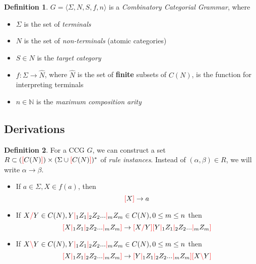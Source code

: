 \documentclass[12pt]{extarticle}
\theoremstyle{definition} \newtheorem{defn}{Definition}
\theoremstyle{definition} \newtheorem{prop}{Proposition}
\newcommand{\lc}{\textcolor{red}{\backslash}}
\newcommand{\rc}{\textcolor{red}{/}}
\newcommand{\mc}{\textcolor{red}{|}}
\newcommand{\lb}{\textcolor{red}{[}}
\newcommand{\rb}{\textcolor{red}{]}}
\begin{document}
\begin{defn}
    $ G = \langle \Sigma, N, S, f, n \rangle $ is a \emph{Combinatory Categorial Grammar}, where
    \begin{itemize}
        \item $ \Sigma $ is the set of \emph{terminals}
        \item $ N $ is the set of \emph{non-terminals} (atomic categories)
        \item $ S \in N $ is the \emph{target category}
        \item $ f : \Sigma \rightarrow \hat{N} $, where $\hat{N}$ is the set of
            \textbf{finite} subsets of $C(N)$, is the function for interpreting
            terminals
        \item $ n \in \mathbb{N} $ is the \emph{maximum composition arity}
    \end{itemize}
\end{defn}

\pagebreak
\subsection{Derivations}

\begin{defn}
    For a CCG $G$, we can construct a set $R \subset (\lb C(N) \rb) \times (\Sigma \cup \lb C(N) \rb)^*$
    of \emph{rule instances}. Instead of $(\alpha, \beta) \in R$, we will write
    $\alpha \rightarrow \beta$.

    \begin{itemize}
        \item If $ a \in \Sigma, X \in f(a) $, then \[ \lb X \rb \rightarrow a \]
        \item If $ X \rc Y \in C(N), Y \mc_1 Z_1 \mc_2 Z_2 ... \mc_m Z_m \in C(N), 0 \leq m \leq n $
            then \[ \lb X \mc_1 Z_1 \mc_2 Z_2 ... \mc_m Z_m \rb \rightarrow \lb X \rc Y \rb \lb Y \mc_1 Z_1 \mc_2 Z_2 ... \mc_m Z_m \rb \]
        \item If $ X \lc Y \in C(N), Y \mc_1 Z_1 \mc_2 Z_2 ... \mc_m Z_m \in C(N), 0 \leq m \leq n $
            then \[ \lb X \mc_1 Z_1 \mc_2 Z_2 ... \mc_m Z_m \rb \rightarrow \lb Y \mc_1 Z_1 \mc_2 Z_2 ... \mc_m Z_m \rb \lb X \lc Y \rb \]
    \end{itemize}
\end{defn}
\end{document}
